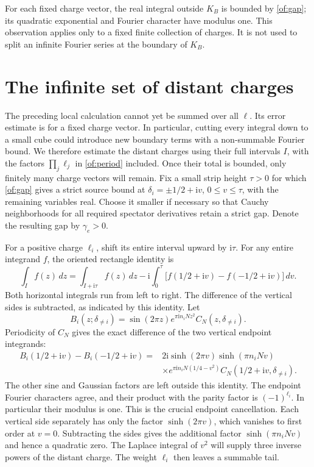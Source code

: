\documentclass[11pt]{article}
\numberwithin{equation}{section}
\theoremstyle{definition}\newtheorem{definition}[theorem]{Definition}
\theoremstyle{remark}\newtheorem{remark}[theorem]{Remark}
\newcommand{\ii}{\mathrm i}
\begin{document}
For each fixed charge vector, the real integral outside $K_B$ is bounded by
\eqref{of:gap}; its quadratic exponential and Fourier character have modulus one.
This observation applies only to a fixed finite collection of charges.
It is not used to split an infinite Fourier series at the boundary of
$K_B$.

\section{The infinite set of distant charges}

The preceding local calculation cannot yet be summed over all
$\ell$. Its error estimate is for a fixed charge vector. In
particular, cutting every integral down to a small cube could introduce
new boundary terms with a non-summable Fourier bound.
We therefore estimate the distant charges using their full intervals
$I$, with the factors $\prod_j\ell_j$ in \eqref{of:period}
included. Once their total is bounded, only finitely many charge
vectors will remain. Fix a small strip height $\tau>0$ for which
\eqref{of:gap} gives a strict source bound at
$\delta_i=\pm1/2+\ii v$, $0\le v\le\tau$, with the remaining
variables real. Choose it smaller if necessary so that Cauchy
neighborhoods for all required spectator derivatives retain a strict
gap. Denote the resulting gap by $\gamma_e>0$.

For a positive charge $\ell_i$, shift its entire interval upward by
$\ii\tau$. For any entire integrand $f$, the oriented rectangle identity is
\[
 \int_I f(z)\,dz=\int_{I+\ii\tau}f(z)\,dz
   -\ii\int_0^\tau
       \bigl[f(1/2+\ii v)-f(-1/2+\ii v)\bigr]\,dv.
\]
Both horizontal integrals run from left to right. The difference of
the vertical sides is subtracted, as indicated by this identity.
Let
\[
 B_i(z;\delta_{\ne i})=
       \sin(2\pi z)e^{\pi\ii n_iNz^2}C_N(z,\delta_{\ne i}).
\]
Periodicity of $C_N$ gives the exact difference of the two vertical
endpoint integrands:
\begin{equation}\label{of:paired-current}
\begin{split}
 B_i(1/2+\ii v)-B_i(-1/2+\ii v)
 ={}&2\ii\sinh(2\pi v)\sinh(\pi n_iNv)\\
 &\times e^{\pi\ii n_iN(1/4-v^2)}
                 C_N(1/2+\ii v,\delta_{\ne i}).
\end{split}
\end{equation}
The other sine and Gaussian factors are left outside this identity.
The endpoint Fourier characters agree, and their product with the
parity factor is $(-1)^{\ell_i}$. In particular their modulus is one.
This is the crucial endpoint cancellation. Each vertical side
separately has only the factor $\sinh(2\pi v)$, which vanishes to
first order at $v=0$. Subtracting the sides gives the additional
factor $\sinh(\pi n_iNv)$ and hence a quadratic zero. The Laplace
integral of $v^2$ will supply three inverse powers of the distant
charge. The weight $\ell_i$ then leaves a summable tail.
\end{document}
